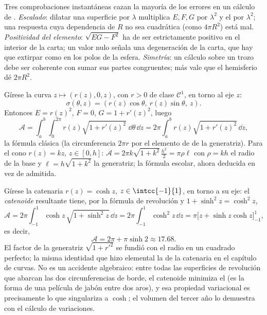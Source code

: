 \begin{remark}
Tres comprobaciones instantáneas cazan la mayoría de los errores en
un cálculo de . \emph{Escalado}: dilatar una superficie por
$\lambda$ multiplica $E, F, G$ por $\lambda^2$ y el  por
$\lambda^2$; una respuesta cuya dependencia de $R$ no sea cuadrática
(como $4\pi R^2$) está mal. \emph{Positividad del elemento}:
$\sqrt{EG - F^2}$ ha de ser estrictamente positivo en el interior de
la carta; un valor nulo señala una degeneración de la carta, que hay
que extirpar como en los polos de la esfera. \emph{Simetría}: un
cálculo sobre un trozo  debe ser coherente con sumar sus
partes congruentes; más vale que el hemisferio dé $2\pi R^2$.
\end{remark}

\begin{example}\label{ex:b2:surfaces:revolution}
Gírese la curva $z \mapsto (r(z), 0, z)$, con $r > 0$ de clase
$\mathcal{C}^1$, en torno al eje $z$:
\[
\sigma(\theta, z) = (r(z)\cos\theta,\ r(z)\sin\theta,\ z).
\]
Entonces $E = r(z)^2$, $F = 0$, $G = 1 + r'(z)^2$, luego
\[
\mathcal{A} = \int_a^b\!\!\int_0^{2\pi}
r(z)\sqrt{1 + r'(z)^2}\;\dd\theta\,\dd z
= 2\pi\int_a^b r(z)\sqrt{1 + r'(z)^2}\,\dd z ,
\]
la fórmula clásica (la circunferencia $2\pi r$ por el elemento de
 de la generatriz). Para el cono $r(z) = kz$, $z \in [0, h]$:
$\mathcal A = 2\pi k\sqrt{1 + k^2}\,\frac{h^2}{2} = \pi \rho \ell$
con $\rho = kh$ el radio de la base y $\ell = h\sqrt{1 + k^2}$ la
generatriz; la fórmula escolar, ahora deducida en vez de admitida.
\end{example}

\begin{example}[El catenoide]\label{ex:b2:surfaces:catenoid}
Gírese la catenaria $r(z) = \cosh z$, $z \in \intcc{-1}{1}$, en torno
a su eje: el \emph{catenoide} resultante tiene, por la fórmula de
revolución y $1 + \sinh^2 z = \cosh^2 z$,
\[
\mathcal A = 2\pi\int_{-1}^1\cosh z\,\sqrt{1 + \sinh^2z}\,
\dd z = 2\pi\int_{-1}^1\cosh^2z\,\dd z
= \pi\bigl[z + \sinh z\cosh z\bigr]_{-1}^{1},
\]
es decir,
\[
\mathcal A = 2\pi + \pi\sinh 2 \approx 17.68 .
\]
El factor de la generatriz $\sqrt{1 + r'^2}$ se fundió con el radio
en un cuadrado perfecto; la misma identidad que hizo elemental la
 de la catenaria en el capítulo de curvas. No es un
accidente algebraico: entre todas las superficies de revolución que
abarcan las dos circunferencias de borde, el catenoide minimiza el
 (es la forma de una película de jabón entre dos aros), y esa
propiedad variacional es precisamente lo que singulariza a $\cosh$;
el volumen del tercer año lo demuestra con el cálculo de
variaciones.
\end{example}

